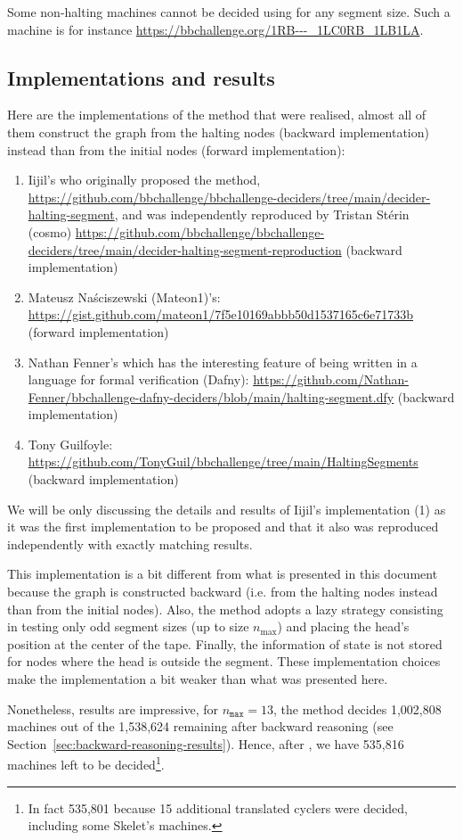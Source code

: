 \begin{remark}
  Some non-halting machines cannot be decided using \HS for any segment size. Such a machine is for instance \url{https://bbchallenge.org/1RB---_1LC0RB_1LB1LA}.
\end{remark}

\subsection{Implementations and results}\label{sec:hs-implem}


Here are the implementations of the method that were realised, almost all of them construct the \HS graph from the halting nodes (backward implementation) instead than from the initial nodes (forward implementation):

\begin{enumerate}
  \item Iijil's who originally proposed the method, \url{https://github.com/bbchallenge/bbchallenge-deciders/tree/main/decider-halting-segment}, and was independently reproduced by Tristan Stérin (cosmo) \url{https://github.com/bbchallenge/bbchallenge-deciders/tree/main/decider-halting-segment-reproduction} (backward implementation)
  \item Mateusz Naściszewski (Mateon1)'s: \url{https://gist.github.com/mateon1/7f5e10169abbb50d1537165c6e71733b} (forward implementation)
  \item Nathan Fenner's which has the interesting feature of being written in a language for formal verification (Dafny): \url{https://github.com/Nathan-Fenner/bbchallenge-dafny-deciders/blob/main/halting-segment.dfy} (backward implementation)
  \item Tony Guilfoyle: \url{https://github.com/TonyGuil/bbchallenge/tree/main/HaltingSegments} (backward implementation)
\end{enumerate}

We will be only discussing the details and results of Iijil's implementation (1) as it was the first implementation to be proposed and that it also was reproduced independently with exactly matching results.

This implementation is a bit different from what is presented in this document because the \HS graph is constructed backward (i.e. from the halting nodes instead than from the initial nodes). Also, the method adopts a lazy strategy consisting in testing only odd segment sizes (up to size $n_\text{max}$) and placing the head's position at the center of the tape. Finally, the information of state is not stored for nodes where the head is outside the segment. These implementation choices make the implementation a bit weaker than what was presented here.

Nonetheless, results are impressive, for $n_\texttt{max} = 13$, the method decides 1,002,808 machines out of the 1,538,624 remaining after backward reasoning (see Section~\ref{sec:backward-reasoning-results}). Hence, after \HS, we have 535,816 machines left to be decided\footnote{In fact 535,801 because 15 additional translated cyclers were decided, including some Skelet's machines.}.
